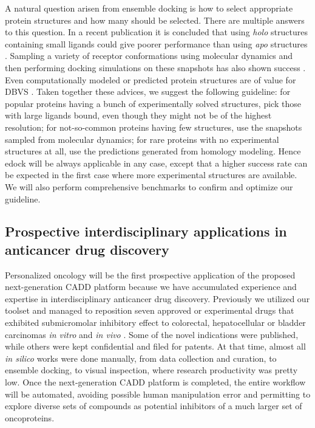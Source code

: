 \documentclass[a4paper,12pt]{article}
\begin{document}
A natural question arisen from ensemble docking is how to select appropriate protein structures and how many should be selected. There are multiple answers to this question. In a recent publication it is concluded that using \textit{holo} structures containing small ligands could give poorer performance than using \textit{apo} structures \citep{1704}. Sampling a variety of receptor conformations using molecular dynamics and then performing docking simulations on these snapshots has also shown success \citep{1730}. Even computationally modeled or predicted protein structures are of value for DBVS \citep{1322,1277}. Taken together these advices, we suggest the following guideline: for popular proteins having a bunch of experimentally solved structures, pick those with large ligands bound, even though they might not be of the highest resolution; for not-so-common proteins having few structures, use the snapshots sampled from molecular dynamics; for rare proteins with no experimental structures at all, use the predictions generated from homology modeling. Hence edock will be always applicable in any case, except that a higher success rate can be expected in the first case where more experimental structures are available. We will also perform comprehensive benchmarks to confirm and optimize our guideline.

\subsection*{Prospective interdisciplinary applications in anticancer drug discovery}

Personalized oncology will be the first prospective application of the proposed next-generation CADD platform because we have accumulated experience and expertise in interdisciplinary anticancer drug discovery. Previously we utilized our toolset and managed to reposition seven approved or experimental drugs that exhibited submicromolar inhibitory effect to colorectal, hepatocellular or bladder carcinomas \textit{in vitro} and \textit{in vivo} \citep{1667,1681}. Some of the novel indications were published, while others were kept confidential and filed for patents. At that time, almost all \textit{in silico} works were done manually, from data collection and curation, to ensemble docking, to visual inspection, where research productivity was pretty low. Once the next-generation CADD platform is completed, the entire workflow will be automated, avoiding possible human manipulation error and permitting to explore diverse sets of compounds as potential inhibitors of a much larger set of oncoproteins.
\end{document}
